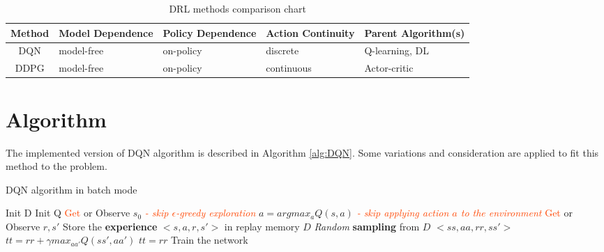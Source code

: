 \documentclass[12pt]{report}
\begin{document}
\begin{table}
    \centering
    \begin{tabular}{|c|L|L|L|L|}
        \hline
        \textbf{Method}  &    \textbf{Model Dependence}    &   \textbf{Policy Dependence}   &   \textbf{Action Continuity}  & \textbf{Parent Algorithm(s)}\\
        \hline
        \hline
        DQN &   model-free  &   on-policy   &   discrete    &   Q-learning, DL\\
        \hline
        DDPG    &   model-free  &   on-policy   &   continuous  &   Actor-critic\\
        \hline
    \end{tabular}
    \caption{DRL methods comparison chart}
    \label{tab:dqn vs. ddpg}
\end{table}

\section{Algorithm}
The implemented version of DQN algorithm is described in Algorithm \ref{alg:DQN}. Some variations and consideration are applied to fit this method to the problem.

\begin{algorithm}[H]
\caption{DQN algorithm in batch mode}
\label{alg:DQN}
\begin{algorithmic}[1]
    \State Init D \Comment{\textcolor{BlueViolet}{replay memory}}
    \State Init Q \Comment{\textcolor{BlueViolet}{Q-table w/ random weights}}
    \State \textcolor{OrangeRed}{Get} or Observe $s_0$ \Comment{\textcolor{BlueViolet}{the initial state}}
            \State \textit{\textcolor{OrangeRed}{- skip $\epsilon$-greedy exploration}}
            \State $a = argmax_a Q(s,a)$
            \State \textit{\textcolor{OrangeRed}{- skip applying action $a$ to the environment}}
            \State \textcolor{OrangeRed}{Get} or Observe $r, s'$
            \State Store the \textbf{experience} $<s, a, r, s'>$ in replay memory $D$
            \State \textit{Random} \textbf{sampling} from $D$ $<ss, aa, rr, ss'>$  \Comment{\textcolor{BlueViolet}{[mini]-batch}}
             \Comment{\textcolor{BlueViolet}{target for each mini-batch}}
                \State $tt = rr + \gamma max_{aa'} Q(ss', aa')$
            \Else
                \State $tt = rr$
            \EndIf
            \State Train the network
        \EndFor    
    \EndFor
\end{algorithmic}
\end{algorithm}
\end{document}
